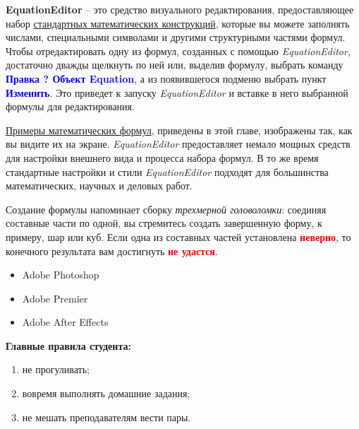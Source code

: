 \documentclass[12pt]{article}
\begin{document}
{\Large \bfseries EquationEditor} – это средство визуального редактирования, предоставляющее набор \underline{стандартных математических конструкций}, которые вы можете заполнять числами, специальными символами и другими структурными частями формул. Чтобы отредактировать одну из формул, созданных с помощью {\it EquationEditor}, достаточно дважды щелкнуть по ней или, выделив формулу, выбрать команду {\bfseries \textcolor{blue}{Правка ? Объект Equation}}, а из появившегося подменю выбрать пункт {\bfseries \textcolor{blue}{Изменить}}. Это приведет к запуску {\it EquationEditor} и вставке в него выбранной формулы для редактирования.


\underline{Примеры математических формул}, приведены в этой главе, изображены так, как вы видите их на экране. 
{\it EquationEditor} предоставляет немало мощных средств для настройки внешнего вида и процесса набора формул. В то же время стандартные настройки и стили {\it EquationEditor} подходят для большинства математических, научных и деловых  работ.
\begin{center}


Создание формулы напоминает сборку {\sl трехмерной головоломки}: соединяя составные части по одной, вы стремитесь создать завершенную форму, к примеру, шар или куб. Если одна из составных частей установлена {\bf \textcolor{red}{неверно}}, то конечного результата вам достигнуть {\bfseries \textcolor{red}{не удастся}}.
\end{center}



\begin{itemize}
\item Adobe Photoshop
\item Adobe Premier
\item Adobe After Effects
\end{itemize}

\renewcommand{\theenumi}{(\asbuk{enumi})}
\renewcommand{\labelenumi}{\asbuk{enumi})}
\colorbox{light-blue}{\bf Главные правила студента:}
\begin{enumerate}
\item\label{boss} не прогуливать;
\item вовремя выполнять домашние задания;
\item не мешать преподавателям вести пары.
\end{enumerate}
\end{document}
